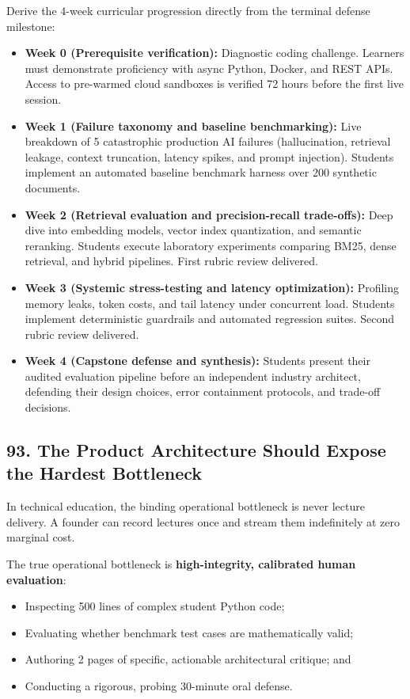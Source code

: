 Derive the 4-week curricular progression directly from the terminal defense milestone:
\begin{itemize}
    \item \textbf{Week 0 (Prerequisite verification):} Diagnostic coding challenge. Learners must demonstrate proficiency with async Python, Docker, and REST APIs. Access to pre-warmed cloud sandboxes is verified 72 hours before the first live session.
    \item \textbf{Week 1 (Failure taxonomy and baseline benchmarking):} Live breakdown of 5 catastrophic production AI failures (hallucination, retrieval leakage, context truncation, latency spikes, and prompt injection). Students implement an automated baseline benchmark harness over 200 synthetic documents.
    \item \textbf{Week 2 (Retrieval evaluation and precision-recall trade-offs):} Deep dive into embedding models, vector index quantization, and semantic reranking. Students execute laboratory experiments comparing BM25, dense retrieval, and hybrid pipelines. First rubric review delivered.
    \item \textbf{Week 3 (Systemic stress-testing and latency optimization):} Profiling memory leaks, token costs, and tail latency under concurrent load. Students implement deterministic guardrails and automated regression suites. Second rubric review delivered.
    \item \textbf{Week 4 (Capstone defense and synthesis):} Students present their audited evaluation pipeline before an independent industry architect, defending their design choices, error containment protocols, and trade-off decisions.
\end{itemize}

\subsection*{93. The Product Architecture Should Expose the Hardest Bottleneck}

In technical education, the binding operational bottleneck is never lecture delivery. A founder can record lectures once and stream them indefinitely at zero marginal cost.

The true operational bottleneck is \textbf{high-integrity, calibrated human evaluation}:
\begin{itemize}
    \item Inspecting 500 lines of complex student Python code;
    \item Evaluating whether benchmark test cases are mathematically valid;
    \item Authoring 2 pages of specific, actionable architectural critique; and
    \item Conducting a rigorous, probing 30-minute oral defense.
\end{itemize}

